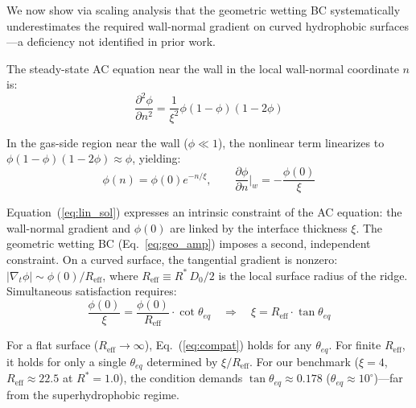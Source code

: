 We now show via scaling analysis that the geometric wetting BC systematically underestimates the required wall-normal gradient on curved hydrophobic surfaces---a deficiency not identified in prior work.

The steady-state AC equation near the wall in the local wall-normal coordinate $n$ is:
\begin{equation}\label{eq:ac_steady}
    \frac{\partial^2\phi}{\partial n^2} = \frac{1}{\xi^2} \phi(1-\phi)(1-2\phi)
\end{equation}

In the gas-side region near the wall ($\phi \ll 1$), the nonlinear term linearizes to $\phi(1-\phi)(1-2\phi) \approx \phi$, yielding:
\begin{equation}\label{eq:lin_sol}
    \phi(n) = \phi(0) e^{-n/\xi}, \qquad \frac{\partial\phi}{\partial n}\Big|_w = -\frac{\phi(0)}{\xi}
\end{equation}

Equation~(\ref{eq:lin_sol}) expresses an intrinsic constraint of the AC equation: the wall-normal gradient and $\phi(0)$ are linked by the interface thickness $\xi$. The geometric wetting BC (Eq.~\ref{eq:geo_amp}) imposes a second, independent constraint. On a curved surface, the tangential gradient is nonzero: $|\nabla_t\phi| \sim \phi(0)/R_\mathrm{eff}$, where $R_\mathrm{eff} \equiv R^*\,D_0/2$ is the local surface radius of the ridge. Simultaneous satisfaction requires:
\begin{equation}\label{eq:compat}
    \frac{\phi(0)}{\xi} = \frac{\phi(0)}{R_\mathrm{eff}} \cdot \cot\theta_{eq}
    \quad\Longrightarrow\quad \xi = R_\mathrm{eff} \cdot \tan\theta_{eq}
\end{equation}

For a flat surface ($R_\mathrm{eff} \to \infty$), Eq.~(\ref{eq:compat}) holds for any $\theta_{eq}$. For finite $R_\mathrm{eff}$, it holds for only a single $\theta_{eq}$ determined by $\xi/R_\mathrm{eff}$. For our benchmark ($\xi = 4$, $R_\mathrm{eff} \approx 22.5$ at $R^* = 1.0$), the condition demands $\tan\theta_{eq} \approx 0.178$ ($\theta_{eq} \approx 10^\circ$)---far from the superhydrophobic regime.

